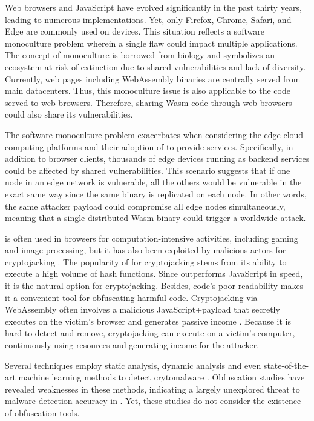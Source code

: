
Web browsers and JavaScript have evolved significantly in the past thirty years, leading to numerous implementations. 
Yet, only Firefox, Chrome, Safari, and Edge are commonly used on devices.
This situation reflects a software monoculture problem wherein a single flaw could impact multiple applications. 
The concept of monoculture is borrowed from biology and symbolizes an ecosystem at risk of extinction due to shared vulnerabilities and lack of diversity. 
Currently, web pages including WebAssembly binaries are centrally served from main datacenters. 
Thus, this monoculture issue is also applicable to the \Wasm code served to web browsers. 
Therefore, sharing Wasm code through web browsers could also share its vulnerabilities. 

The software monoculture problem exacerbates when considering the edge-cloud computing platforms and their adoption of \Wasm to provide services.
Specifically, in addition to browser clients, thousands of edge devices running \Wasm as backend services could be affected by shared vulnerabilities. 
This scenario suggests that if one node in an edge network is vulnerable, all the others would be vulnerable in the exact same way since the same binary is replicated on each node. 
In other words, the same attacker payload could compromise all edge nodes simultaneously, meaning that a single distributed Wasm binary could trigger a worldwide attack.



\Wasm is often used in browsers for computation-intensive activities, including gaming and image processing, but it has also been exploited by malicious actors for cryptojacking \cite{10.1145/3339252.3339261}.
The popularity of \Wasm for cryptojacking stems from its ability to execute a high volume of hash functions. 
Since \Wasm outperforms JavaScript in speed, it is the natural option for cryptojacking.
Besides, \Wasm code's poor readability makes it a convenient tool for obfuscating harmful code.
Cryptojacking via WebAssembly often involves a malicious JavaScript+\Wasm payload that secretly executes on the victim's browser and generates passive income \cite{9566204}.
Because it is hard to detect and remove, cryptojacking can execute on a victim's computer, continuously using resources and generating income for the attacker.


Several techniques employ static analysis, dynamic analysis and even state-of-the-art machine learning methods to detect \Wasm crytomalware \cite{Minesweeper,MinerRay,MINOS,SEISMIC,RAPID,Outguard}.
Obfuscation studies have revealed weaknesses in these methods, indicating a largely unexplored threat to malware detection accuracy in \Wasm.
Yet, these studies do not consider the existence of obfuscation tools.








